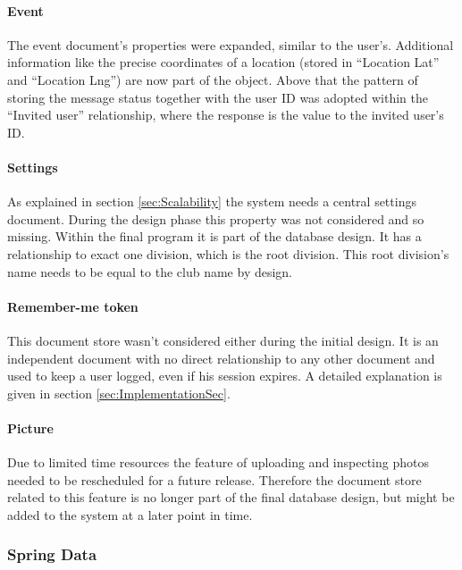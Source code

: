 \paragraph{Event}

The event document's properties were expanded, similar to the user's. Additional information like the precise coordinates of a location (stored in \enquote{Location Lat} and \enquote{Location Lng}) are now part of the object. Above that the pattern of storing the message status together with the user ID was adopted within the \enquote{Invited user} relationship, where the response is the value to the invited user's ID.

\paragraph{Settings}

As explained in section \vref{sec:Scalability} the system needs a central settings document. During the design phase this property was not considered and so missing. Within the final program it is part of the database design. It has a relationship to exact one division, which is the root division. This root division's name needs to be equal to the club name by design. 

\paragraph{Remember-me token}

This document store wasn't considered either during the initial design. It is an independent document with no direct relationship to any other document and used to keep a user logged, even if his session expires. A detailed explanation is given in section \vref{sec:ImplementationSec}. 

\paragraph{Picture}

Due to limited time resources the feature of uploading and inspecting photos needed to be rescheduled for a future release. Therefore the document store related to this feature is no longer part of the final database design, but might be added to the system at a later point in time.

\subsubsection{Spring Data}

